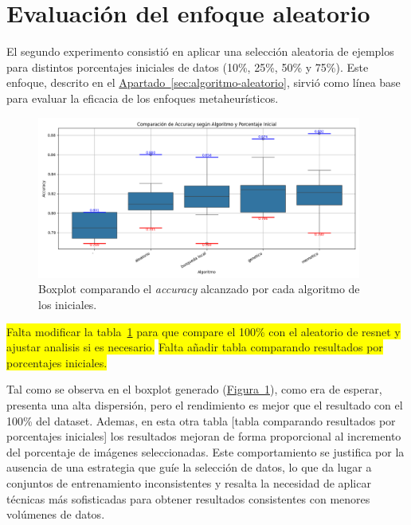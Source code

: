 \section{Evaluación del enfoque aleatorio}\label{sec:evaluacion-enfoque-aleatorio}
El segundo experimento consistió en aplicar una selección aleatoria de ejemplos para distintos porcentajes iniciales de datos (10\%, 25\%, 50\% y 75\%).
Este enfoque, descrito en el \hyperref[sec:algoritmo-aleatorio]{Apartado~\ref*{sec:algoritmo-aleatorio}}, sirvió como línea base para evaluar la eficacia de los enfoques metaheurísticos.

\begin{figure}[!h]
    \centering
    \includegraphics[width=0.95\textwidth]{imagenes/mobilenet-BOXPLOT-generacion-inicial}
    \caption{Boxplot comparando el \textit{accuracy} alcanzado por cada algoritmo de los iniciales.}
    \label{fig:resnet-boxplot-generacion-inicial}
\end{figure}

\colorbox{yellow}{Falta modificar la tabla~\ref{fig:resnet-boxplot-generacion-inicial} para que compare el 100\% con el aleatorio de resnet y ajustar analisis si es necesario.}
\colorbox{yellow}{Falta añadir tabla comparando resultados por porcentajes iniciales.}

Tal como se observa en el boxplot generado (\hyperref[fig:resnet-boxplot-generacion-inicial]{Figura~\ref*{fig:resnet-boxplot-generacion-inicial}}),
como era de esperar, presenta una alta dispersión, pero el rendimiento es mejor que el resultado con el 100\% del dataset.
Ademas, en esta otra tabla [tabla comparando resultados por porcentajes iniciales] los resultados mejoran de forma proporcional al incremento del porcentaje de imágenes seleccionadas.
Este comportamiento se justifica por la ausencia de una estrategia que guíe la selección de datos, lo que da lugar a conjuntos de entrenamiento inconsistentes y
resalta la necesidad de aplicar técnicas más sofisticadas para obtener resultados consistentes con menores volúmenes de datos.


